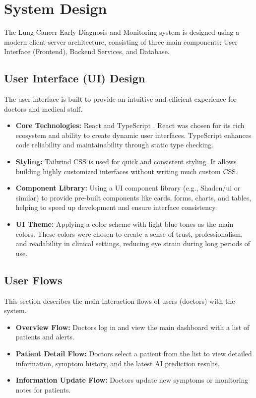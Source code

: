 \section{System Design}

The Lung Cancer Early Diagnosis and Monitoring system is designed using a modern client-server architecture, consisting of three main components: User Interface (Frontend), Backend Services, and Database.

\subsection{User Interface (UI) Design}

The user interface is built to provide an intuitive and efficient experience for doctors and medical staff.
\begin{itemize}
    \item \textbf{Core Technologies:} React \cite{react} and TypeScript \cite{typescript}. React was chosen for its rich ecosystem and ability to create dynamic user interfaces. TypeScript enhances code reliability and maintainability through static type checking.
    \item \textbf{Styling:} Tailwind CSS \cite{tailwindcss} is used for quick and consistent styling. It allows building highly customized interfaces without writing much custom CSS.
    \item \textbf{Component Library:} Using a UI component library (e.g., Shadcn/ui \cite{shadcnui} or similar) to provide pre-built components like cards, forms, charts, and tables, helping to speed up development and ensure interface consistency.
    \item \textbf{UI Theme:} Applying a color scheme with light blue tones as the main colors. These colors were chosen to create a sense of trust, professionalism, and readability in clinical settings, reducing eye strain during long periods of use.
\end{itemize}

\subsection{User Flows}
This section describes the main interaction flows of users (doctors) with the system.
\begin{itemize}
    \item \textbf{Overview Flow:} Doctors log in and view the main dashboard with a list of patients and alerts.
    \item \textbf{Patient Detail Flow:} Doctors select a patient from the list to view detailed information, symptom history, and the latest AI prediction results.
    \item \textbf{Information Update Flow:} Doctors update new symptoms or monitoring notes for patients.
\end{itemize}

